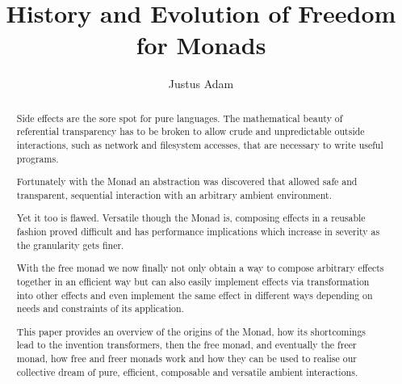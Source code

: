 \documentclass[sigconf]{acmart}
\begin{document}
\title{History and Evolution of Freedom for Monads}


\author{Justus Adam}
\affiliation{}


\begin{abstract}
Side effects are the sore spot for pure languages. The mathematical
beauty of referential transparency has to be broken to allow crude and
unpredictable outside interactions, such as network and filesystem
accesses, that are necessary to write useful programs.

Fortunately with the Monad an abstraction was discovered that allowed
safe and transparent, sequential interaction with an arbitrary ambient
environment.

Yet it too is flawed. Versatile though the Monad is, composing
effects in a reusable fashion proved difficult and has performance
implications which increase in severity as the granularity gets finer.

With the free monad we now finally not only obtain a way to compose
arbitrary effects together in an efficient way but can also easily
implement effects via transformation into other effects and even
implement the same effect in different ways depending on needs and
constraints of its application.

This paper provides an overview of the origins of the Monad, how its
shortcomings lead to the invention transformers, then the free monad,
and eventually the freer monad, how free and freer monads work and how
they can be used to realise our collective dream of pure, efficient,
composable and versatile ambient interactions.
\end{abstract}

\maketitle







\end{document}
